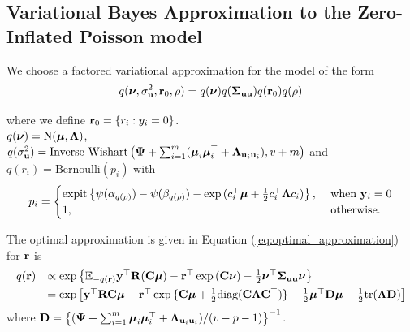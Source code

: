 \subsection{Variational Bayes Approximation to the Zero-Inflated Poisson model}

We choose a factored variational approximation for the model of the form 
\[
	q({\boldsymbol \nu}, \sigma_{{\bf u}}^2,{\bf r}_0, \rho) = q({\boldsymbol \nu}) q({\boldsymbol \Sigma}_{{\bf u} {\bf u}}) q({\bf r}_0) q(\rho)
\]

\noindent 
where we define ${\bf r}_0 = \{ r_i : y_i = 0 \}$. \\
$q({\boldsymbol \nu}) = \text{N}({\boldsymbol \mu}, {\boldsymbol \Lambda})$, \\
$q(\sigma_{{\bf u}}^2) = \text{Inverse Wishart}\left({\boldsymbol \Psi} + \sum_{i=1}^m ({\boldsymbol \mu}_i {\boldsymbol \mu}_i^\top + {\boldsymbol \Lambda}_{{\bf u}_i {\bf u}_i}), v + m \right)$ \mbox{and } \\
$q(r_i) = \text{Bernoulli}{(p_i)}$ with
$$p_i = 
\begin{cases}
\text{expit}\left\{ \psi{(\alpha_{q(\rho)})} - \psi{(\beta_{q(\rho)})} - \exp{(c_i^\top{\boldsymbol\mu}+ \frac{1}{2} c_i^\top {\boldsymbol\Lambda}c_i)} \right\},& \text{ when } {\bf y}_i = 0\\
1,& \text{ otherwise.}
\end{cases}$$


The optimal approximation is given in Equation (\ref{eq:optimal_approximation})
for ${\bf r}$ is
\begin{equation}
\label{eq:optimal_approximation}
\begin{array}{rl}
	q({\bf r}) & \propto \exp \left \{ {\mathbb E}_{-q({\bf r})}{\bf y}^\top{\bf R}({\bf C}{\boldsymbol \mu}) - {\bf r}^\top\exp{({\bf C}{\boldsymbol\nu})}-\frac{1}{2} {\boldsymbol \nu}^\top {\boldsymbol\Sigma}_{{\bf u} {\bf u}} {\boldsymbol \nu} \right \}                                                  \\ [1ex]
	       & = \exp{ \left[ {\bf y}^\top{\bf R}{\bf C}{\boldsymbol\mu}- {\bf r}^\top \exp{\{{\bf C}{\boldsymbol\mu}+ \frac{1}{2} \text{diag}({\bf C}{\boldsymbol\Lambda}{\bf C}^\top)\}} - \frac{1}{2} {\boldsymbol\mu}^\top {\bf D}{\boldsymbol\mu}- \frac{1}{2} \text{tr}({\boldsymbol\Lambda}{\bf D}) \right] } 
\end{array}
\end{equation}
\noindent where ${\bf D} = \left\{ ({\boldsymbol \Psi} + \sum_{i=1}^m {\boldsymbol \mu}_i {\boldsymbol \mu}_i^\top + {\boldsymbol \Lambda}_{{\bf u}_i{\bf u}_i}) / (v - p - 1) \right\}^{-1}$. 

